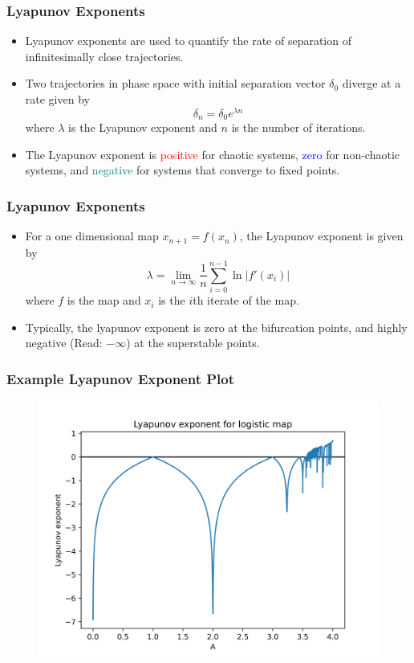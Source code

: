 \documentclass[
	11pt, %
	aspectratio=169, %
]{beamer}
\begin{document}

\begin{frame}
	\frametitle{Lyapunov Exponents}
    \begin{itemize}
        \item Lyapunov exponents are used to quantify the rate of separation of infinitesimally close trajectories. \pause
        \item Two trajectories in phase space with initial separation vector $\delta_0$ diverge at a rate given by 
        \begin{equation}
            \delta_n = \delta_0 e^{\lambda n}
        \end{equation}
        where $\lambda$ is the Lyapunov exponent and $n$ is the number of iterations. \pause
        \item The Lyapunov exponent is \textcolor{red}{positive} for chaotic systems, \textcolor{blue}{zero} for non-chaotic systems, and \textcolor{teal}{negative} for systems that converge to fixed points.
    \end{itemize}
\end{frame}


\begin{frame}
	\frametitle{Lyapunov Exponents}
    \begin{itemize}
        \item For a one dimensional map $x_{n+1} = f(x_n)$, the Lyapunov exponent is given by
        \begin{equation}
            \lambda = \lim_{n \to \infty} \frac{1}{n} \sum_{i=0}^{n-1} \ln \left| f'(x_i) \right|
        \end{equation}
        where $f$ is the map and $x_i$ is the $i$th iterate of the map. \pause
        \item Typically, the lyapunov exponent is zero at the bifurcation points, and highly negative (Read: $-\infty$) at the superstable points.
    \end{itemize}
\end{frame}


\begin{frame}
	\frametitle{Example Lyapunov Exponent Plot}
    \begin{figure}
        \includegraphics[width=0.6\linewidth]{logistic_lyapunov_exp.png}
    \end{figure}
\end{frame}
\end{document}
